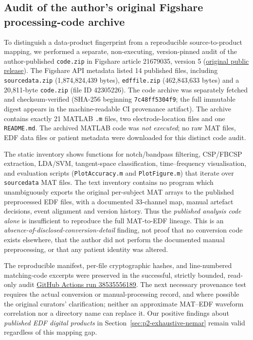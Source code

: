 \subsection{Audit of the author's original Figshare processing-code archive}
\label{sec:p2-original-code-gate}
To distinguish a data-product fingerprint from a reproducible
source-to-product mapping, we performed a separate,
non-executing, version-pinned audit of the author-published
\texttt{code.zip} in Figshare article 21679035, version 5
(\href{https://doi.org/10.6084/m9.figshare.21679035.v5}
{original public release}). The Figshare API metadata listed
14 published files, including \texttt{sourcedata.zip}
(1,874,824,439 bytes), \texttt{edffile.zip}
(462,843,633 bytes) and a 20,811-byte
\texttt{code.zip} (file ID 42305226).
The code archive was separately fetched and checksum-verified
(SHA-256 beginning \texttt{7c48ff5304f9}; the full immutable
digest appears in the machine-readable CI provenance artifact).
The archive contains exactly 21 MATLAB \texttt{.m} files,
two electrode-location files and one \texttt{README.md}.
The archived MATLAB code was \emph{not executed}; no
raw MAT files, EDF data files or patient metadata
were downloaded for this distinct code audit.

The static inventory shows functions for notch/bandpass filtering,
CSP/FBCSP extraction, LDA/SVM, tangent-space classification,
time--frequency visualisation, and evaluation scripts
(\texttt{PlotAccuracy.m} and \texttt{PlotFigure.m}) that iterate
over \texttt{sourcedata} MAT files. The text inventory
contains no program which unambiguously exports the
original per-subject MAT arrays to the published
preprocessed EDF files, with a documented 33-channel map,
manual artefact decisions, event alignment and version history.
Thus the \emph{published analysis code alone} is insufficient
to reproduce the full MAT-to-EDF lineage.
This is an \emph{absence-of-disclosed-conversion-detail}
finding, not proof that no conversion code exists elsewhere,
that the author did not perform the documented manual
preprocessing, or that any patient identity was altered.

The reproducible manifest, per-file cryptographic hashes,
and line-numbered matching-code excerpts were preserved
in the successful, strictly bounded, read-only audit
\href{https://github.com/lindicaphxag-tech/kaggle/actions/runs/38535556189}
{GitHub Actions run 38535556189}.
The next necessary provenance test requires the actual
conversion or manual-processing record, and where possible
the original curators' clarification; neither an
approximate MAT--EDF waveform correlation nor a
directory name can replace it. Our positive findings
about \emph{published EDF digital products} in
Section~\ref{sec:p2-exhaustive-nemar} remain valid
regardless of this mapping gap.
